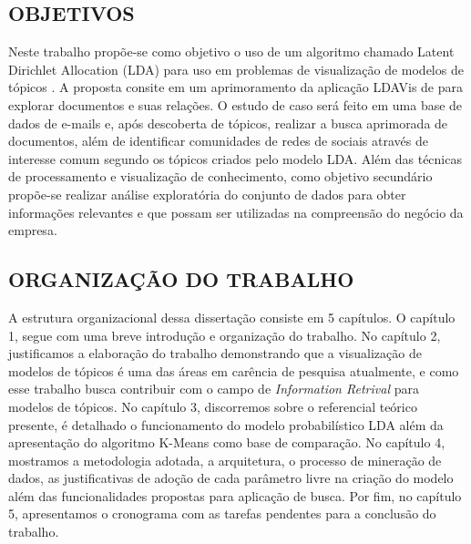 \documentclass[12pt,a4paper]{article}
\begin{document}
  \subsection{OBJETIVOS}
  
  Neste trabalho propõe-se como objetivo o uso de um algoritmo chamado Latent Dirichlet Allocation (LDA) para uso em problemas de visualização de modelos de tópicos \cite{blei2003latent}. A proposta consite em um aprimoramento da aplicação LDAVis de  para explorar documentos e suas relações. O estudo de caso será feito em uma base de dados de e-mails e, após descoberta de tópicos, realizar a busca aprimorada de documentos, além de identificar  comunidades de redes de sociais através de interesse comum segundo os tópicos criados pelo modelo LDA. Além das técnicas de processamento e visualização de conhecimento, como objetivo secundário propõe-se realizar análise exploratória do conjunto de dados para obter informações relevantes e que possam ser utilizadas na compreensão do negócio da empresa.
  
  
  \subsection{ORGANIZAÇÃO DO TRABALHO}
  
   A estrutura organizacional dessa dissertação consiste em 5 capítulos. O capítulo 1, segue com uma breve introdução e organização do trabalho. 
    No capítulo 2, justificamos a elaboração do trabalho demonstrando que a visualização de modelos de tópicos é uma das áreas em carência de pesquisa atualmente, 
    e como esse trabalho busca contribuir com o campo de \textit{Information Retrival} para modelos de tópicos. No capítulo 3, discorremos sobre o referencial teórico presente, 
    é detalhado o funcionamento do modelo probabilístico LDA além da apresentação do algoritmo K-Means como base de comparação. No capítulo 4, mostramos a metodologia adotada, 
    a arquitetura, o processo de mineração de dados, as justificativas de adoção de cada parâmetro livre na criação do modelo além das funcionalidades propostas para
    aplicação de busca. Por fim, no capítulo 5, apresentamos o cronograma com as tarefas pendentes para a conclusão do trabalho.
  
  
  
  
  
\end{document}

